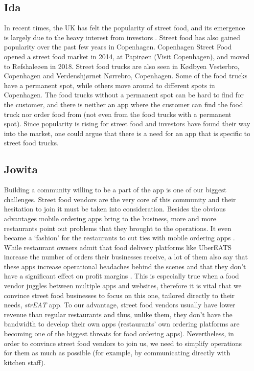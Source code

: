 \subsection{Ida}
In recent times, the UK has felt the popularity of street food, and its emergence is largely due to the heavy interest from investors \cite{Butler}. Street food has also gained popularity over the past few years in Copenhagen. Copenhagen Street Food opened a street food market in 2014, at Papirøen (Visit Copenhagen), and moved to Refshaleøen in 2018. Street food trucks are also seen in Kødbyen Vesterbro, Copenhagen and Verdenshjørnet Nørrebro, Copenhagen. Some of the food trucks have a permanent spot, while others move around to different spots in Copenhagen. The food trucks without a permanent spot can be hard to find for the customer, and there is neither an app where the customer can find the food truck nor order food from (not even from the food trucks with a permanent spot). Since popularity is rising for street food and investors have found their way into the market, one could argue that there is a need for an app that is specific to street food trucks.

\subsection{Jowita}
Building a community willing to be a part of the app is one of our biggest challenges. Street food vendors are the very core of this community and their hesitation to join it must be taken into consideration. Besides the obvious advantages mobile ordering apps bring to the business, more and more restaurants point out problems that they brought to the operations. It even became a ‘fashion’ for the restaurants to cut ties with mobile ordering apps \cite{wsj}. While restaurant owners admit that food delivery platforms like UberEATS increase the number of orders their businesses receive, a lot of them also say that these apps increase operational headaches behind the scenes and that they don’t have a significant effect on profit margins \cite{eater}. This is especially true when a food vendor juggles between multiple apps and websites, therefore it is vital that we convince street food businesses to focus on this one, tailored directly to their needs, \textit{strEAT} app. To our advantage, street food vendors usually have lower revenue than regular restaurants and thus, unlike them, they don’t have the bandwidth to develop their own apps (restaurants' own ordering platforms are becoming one of the biggest threats for food ordering apps). Nevertheless, in order to convince street food vendors to join us, we need to simplify operations for them as much as possible (for example, by communicating directly with kitchen staff).


